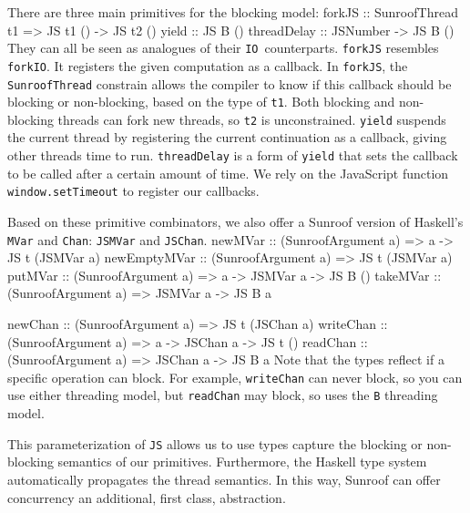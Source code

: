 \documentclass{llncs}
\newcommand{\Src}[1]{{\tt{#1}}}
\newcommand{\IO}{\Src{IO}}
\newenvironment{Code}{\verbatim}{\endverbatim}
\begin{document}
There are three main primitives for the blocking model:
\begin{Code}
forkJS      :: SunroofThread t1 => JS t1 () -> JS t2 ()
yield       :: JS B ()
threadDelay :: JSNumber -> JS B ()
\end{Code}
They can all be seen as analogues of their \IO~counterparts.
\Src{forkJS} resembles \Src{forkIO}.
It registers the given computation as a callback. 
In \Src{forkJS}, the \Src{SunroofThread} constrain allows the compiler
to know if this callback should be blocking or non-blocking,
based on the type of \Src{t1}. Both blocking and non-blocking
threads can fork new threads, so \Src{t2} is unconstrained.
\Src{yield} suspends the current thread by 
registering the current continuation as a callback,
giving other threads time to run.
\Src{threadDelay} is a form of \Src{yield} that sets 
the callback to be called after a certain amount of time.
We rely on the JavaScript function \Src{window.setTimeout} 
\cite{whatwg:timers} to register our callbacks.

Based on these primitive combinators, we also offer a Sunroof 
version of Haskell's \Src{MVar} and \Src{Chan}: \Src{JSMVar} and \Src{JSChan}.
\begin{Code}
newMVar      :: (SunroofArgument a) => a -> JS t (JSMVar a)
newEmptyMVar :: (SunroofArgument a) => JS t (JSMVar a)
putMVar      :: (SunroofArgument a) => a -> JSMVar a -> JS B ()
takeMVar     :: (SunroofArgument a) => JSMVar a -> JS B a

newChan   :: (SunroofArgument a) => JS t (JSChan a)
writeChan :: (SunroofArgument a) => a -> JSChan a -> JS t ()
readChan  :: (SunroofArgument a) => JSChan a -> JS B a
\end{Code}
Note that the types reflect if a specific operation can block.
For example, \Src{writeChan} can never block, so you can use either threading model,
but \Src{readChan} may block, so uses the \Src{B} threading model.


This parameterization of \Src{JS} allows us to use types capture
the blocking or non-blocking semantics of our primitives.
Furthermore, the Haskell type system automatically propagates
the thread semantics. In this way, Sunroof can offer concurrency
an additional, first class, abstraction.

\end{document}
